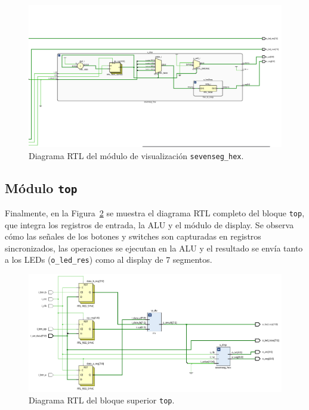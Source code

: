\begin{figure}[H]
    \centering
    \includegraphics[width=\textwidth]{img/disp.png} %
    \caption{Diagrama RTL del módulo de visualización \texttt{sevenseg\_hex}.}
    \label{fig:rtl_disp}
\end{figure}

\subsection{Módulo \texttt{top}}
Finalmente, en la Figura~\ref{fig:rtl_top} se muestra el diagrama RTL completo del bloque \texttt{top}, que integra los registros de entrada, la ALU y el módulo de display. Se observa cómo las señales de los botones y switches son capturadas en registros sincronizados, las operaciones se ejecutan en la ALU y el resultado se envía tanto a los LEDs (\texttt{o\_led\_res}) como al display de 7 segmentos.

\begin{figure}[H]
    \centering
    \includegraphics[width=\textwidth]{img/top.png} %
    \caption{Diagrama RTL del bloque superior \texttt{top}.}
    \label{fig:rtl_top}
\end{figure}
